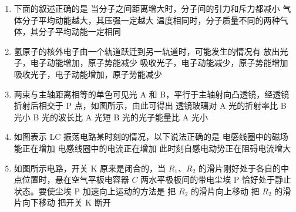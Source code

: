 \documentclass[\gkver]{gaokaozhenti}
\begin{document}
\begin{enumerate}
\item
下面的叙述正确的是
{当分子之间距离增大时，分子间的引力和斥力都减小}
{气体分子平均动能越大，其压强一定越大}
{温度相同时，分子质量不同的两种气体，其分子平均动能一定相同}

\item
氢原子的核外电子由一个轨道跃迁到另一轨道时，可能发生的情况有
{放出光子，电子动能增加，原子势能减少}
{吸收光子，电子动能减少，原子势能增加}
{吸收光子，电子动能增加，原子势能减少}

\item
两束与主轴距离相等的单色可见光 A 和 B，平行于主轴射向凸透镜，经透镜折射后相交于 P 点，如图所示，由此可得出
\onepicture[w=6.34cm]{}
{透镜玻璃对 A 光的折射率比 B 光小}
{B 光的波长比 A 光短}
{B 光的光子能量比 A 光小}

\item
如图表示 LC 振荡电路某时刻的情况，以下说法正确的是
\onepicture[w=2.93cm]{}
{电感线圈中的磁场能正在增加}
{电感线圈中的电流正在增加}
{此时刻自感电动势正在阻碍电流增大}

\item
如图所示电路，开关 K 原来是闭合的，当 $R_{1}$、$R_{2}$ 的滑片刚好处于各自的中点位置时，悬在空气平板电容器 $C$ 两水平极板间的带电尘埃 P 恰好处于静止状态。要使尘埃 P 加速向上运动的方法是
\onepicture[w=3.87cm]{}
{把 $R_{2}$ 的滑片向上移动}
{把 $R_{2}$ 的滑片向下移动}
{把开关 K 断开}


\end{enumerate}
\end{document}
